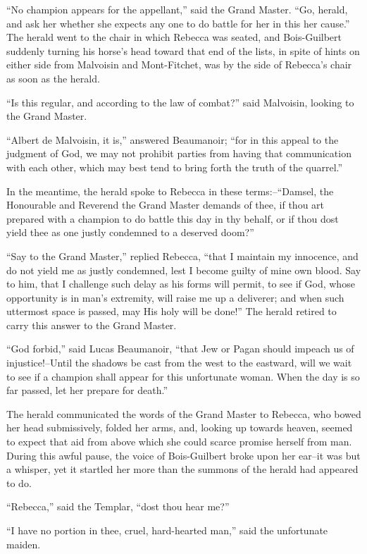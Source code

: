 ``No champion appears for the appellant,'' said the Grand Master. ``Go,
herald, and ask her whether she expects any one to do battle for her in
this her cause.'' The herald went to the chair in which Rebecca was
seated, and Bois-Guilbert suddenly turning his horse's head toward that
end of the lists, in spite of hints on either side from Malvoisin and
Mont-Fitchet, was by the side of Rebecca's chair as soon as the herald.

``Is this regular, and according to the law of combat?'' said Malvoisin,
looking to the Grand Master.

``Albert de Malvoisin, it is,'' answered Beaumanoir; ``for in this
appeal to the judgment of God, we may not prohibit parties from having
that communication with each other, which may best tend to bring forth
the truth of the quarrel.''

In the meantime, the herald spoke to Rebecca in these terms:--``Damsel,
the Honourable and Reverend the Grand Master demands of thee, if thou
art prepared with a champion to do battle this day in thy behalf, or if
thou dost yield thee as one justly condemned to a deserved doom?''

``Say to the Grand Master,'' replied Rebecca, ``that I maintain my
innocence, and do not yield me as justly condemned, lest I become guilty
of mine own blood. Say to him, that I challenge such delay as his forms
will permit, to see if God, whose opportunity is in man's extremity,
will raise me up a deliverer; and when such uttermost space is passed,
may His holy will be done!'' The herald retired to carry this answer to
the Grand Master.

``God forbid,'' said Lucas Beaumanoir, ``that Jew or Pagan should
impeach us of injustice!--Until the shadows be cast from the west to the
eastward, will we wait to see if a champion shall appear for this
unfortunate woman. When the day is so far passed, let her prepare for
death.''

The herald communicated the words of the Grand Master to Rebecca, who
bowed her head submissively, folded her arms, and, looking up towards
heaven, seemed to expect that aid from above which she could scarce
promise herself from man. During this awful pause, the voice of
Bois-Guilbert broke upon her ear--it was but a whisper, yet it startled
her more than the summons of the herald had appeared to do.

``Rebecca,'' said the Templar, ``dost thou hear me?''

``I have no portion in thee, cruel, hard-hearted man,'' said the
unfortunate maiden.

